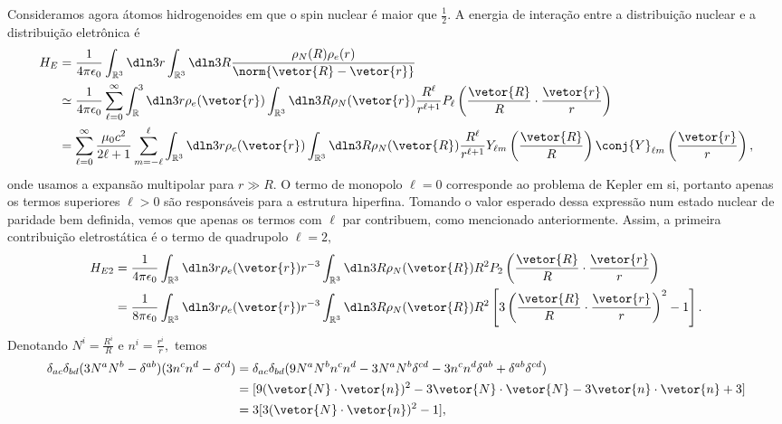 Consideramos agora átomos hidrogenoides em que o spin nuclear é maior que \(\frac12\). A energia de interação entre a distribuição nuclear e a distribuição eletrônica é
\begin{align*}
   H_E &= \frac{1}{4\pi \epsilon_0}\int_{\mathbb{R}^3} \dln3r \int_{\mathbb{R}^3} \dln3R \frac{\rho_N(R) \rho_e(r)}{ \norm{\vetor{R} - \vetor{r}}}\\
       &\simeq \frac{1}{4\pi \epsilon_0} \sum_{\ell = 0}^\infty \int_\mathbb{R}^3\dln3r\rho_e(\vetor{r}) \int_{\mathbb{R}^3} \dln3R \rho_N(\vetor{r})\frac{R^\ell}{r^{\ell +1}} P_\ell\left(\frac{\vetor{R}}{R} \cdot \frac{\vetor{r}}{r}\right)\\
       &= \sum_{\ell = 0}^\infty \frac{\mu_0 c^2}{2\ell + 1}\sum_{m = -\ell}^\ell \int_{\mathbb{R}^3} \dln3r \rho_e(\vetor{r})\int_{\mathbb{R}^3} \dln3R \rho_N(\vetor{R})\frac{R^\ell}{r^{\ell + 1}} Y_{\ell m}\left(\frac{\vetor{R}}{R}\right)\conj{Y}_{\ell m}\left(\frac{\vetor{r}}{r}\right),
\end{align*}
onde usamos a expansão multipolar para \(r \gg R.\) O termo de monopolo \(\ell = 0\) corresponde ao problema de Kepler em si, portanto apenas os termos superiores \(\ell > 0\) são responsáveis para a estrutura hiperfina. Tomando o valor esperado dessa expressão num estado nuclear de paridade bem definida, vemos que apenas os termos com \(\ell\) par contribuem, como mencionado anteriormente. Assim, a primeira contribuição eletrostática é o termo de quadrupolo \(\ell = 2,\)
\begin{align*}
   H_{E2} &= \frac{1}{4\pi \epsilon_0}\int_{\mathbb{R}^3}\dln3r  \rho_e(\vetor{r}) r^{-3} \int_{\mathbb{R}^3} \dln3R \rho_N(\vetor{R})R^2 P_2\left(\frac{\vetor{R}}{R}\cdot \frac{\vetor{r}}{r}\right)\\
          &= \frac1{8\pi \epsilon_0} \int_{\mathbb{R}^3} \dln3r  \rho_e(\vetor{r}) r^{-3} \int_{\mathbb{R}^3} \dln3R \rho_N(\vetor{R}) R^{2} \left[3\left(\frac{\vetor{R}}{R}\cdot\frac{\vetor{r}}{r}\right)^2 - 1\right].
\end{align*}
Denotando \(N^i = \frac{R^i}{R}\) e \(n^i = \frac{r^i}{r},\) temos
\begin{align*}
   \delta_{ac} \delta_{bd} (3N^a N^b - \delta^{ab})(3n^c n^d - \delta^{cd}) 
   &= \delta_{ac}\delta_{bd} (9N^a N^b n^c n^d - 3 N^a N^b \delta^{c d} - 3 n^c n^d \delta^{ab} + \delta^{ab}\delta^{cd})\\
   &= [9 (\vetor{N} \cdot \vetor{n})^2 - 3 \vetor{N}\cdot \vetor{N} - 3 \vetor{n} \cdot \vetor{n} + 3]\\
   &= 3[3(\vetor{N}\cdot \vetor{n})^2 - 1],
\end{align*}
